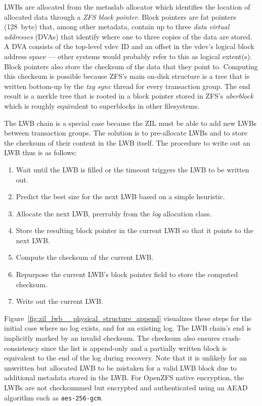 \documentclass[12pt,a4paper,twoside]{book}
\begin{document}
LWBs are allocated from the metaslab allocator which identifies the location of allocated data through a \textit{ZFS block pointer}.
Block pointers are fat pointers (\SI{128}{byte}) that, among other metadata, contain up to three \textit{data virtual addresses} (DVAs) that identify where one to three copies of the data are stored.
A DVA consists of the top-level vdev ID and an offset in the vdev's logical block address space --- other systems would probably refer to this as logical extent(s).
Block pointers also store the checksum of the data that they point to.
Computing this checksum is possible because ZFS's main on-disk structure is a tree that is written bottom-up by the \textit{txg sync} thread for every transaction group.
The end result is a merkle tree that is rooted in a block pointer stored in ZFS's \textit{uberblock} which is roughly equivalent to superblocks in other filesystems.

The LWB chain is a special case because the ZIL must be able to add new LWBs between transaction groups.
The solution is to pre-allocate LWBs and to store the checksum of their content in the LWB itself.
The procedure to write out an LWB thus is as follows:
\begin{enumerate}[noitemsep]
    \item Wait until the LWB is filled or the timeout triggers the LWB to be written out.
    \item Predict the best size for the next LWB based on a simple heuristic.
    \item Allocate the next LWB, prerrably from the \textit{log} allocation class.
    \item Store the resulting block pointer in the current LWB so that it points to the next LWB.
    \item Compute the checksum of the current LWB.
    \item Repurpose the current LWB's block pointer field to store the computed checksum.
    \item Write out the current LWB.
\end{enumerate}
Figure~\ref{fig:zil_lwb__physical_structure_append} visualizes these steps for the initial case where no log exists, and for an existing log.
The LWB chain's end is implicitly marked by an invalid checksum.
The checksum also ensures crash-consistency since the list is append-only and a partially written block is equivalent to the end of the log during recovery.
Note that it is unlikely for an unwritten but allocated LWB to be mistaken for a valid LWB block due to additional metadata stored in the LWB.
For OpenZFS native encryption, the LWBs are not checksummed but encrypted and authenticated using an AEAD algorithm such as \lstinline{aes-256-gcm}.
\end{document}

